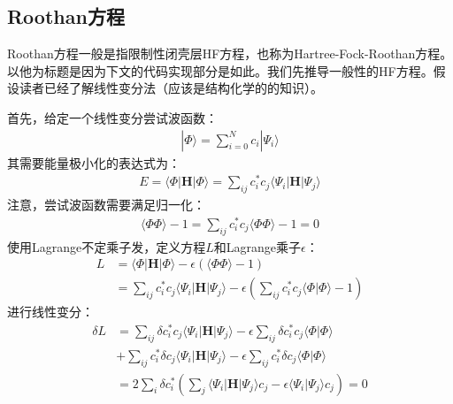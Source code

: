 \documentclass[12pt, a4paper, oneside]{ctexart}
\begin{document}
\subsection{Roothan方程}
Roothan方程一般是指限制性闭壳层HF方程，也称为Hartree-Fock-Roothan方程。以他为标题是因为下文的代码实现部分是如此。我们先推导一般性的HF方程。假设读者已经了解线性变分法（应该是结构化学的的知识）。\par
首先，给定一个线性变分尝试波函数：
\begin{equation}
\begin{aligned}
|\Phi\rangle=\sum_{i=0}^Nc_i|\Psi_i\rangle
\end{aligned}
\end{equation}
其需要能量极小化的表达式为：
\begin{equation}
\begin{aligned}
E=\langle\Phi|\mathbf{H}|\Phi\rangle=\sum_{ij}c_i^*c_j\langle\Psi_i|\mathbf{H}|\Psi_j\rangle
\end{aligned}
\end{equation}
注意，尝试波函数需要满足归一化：
\begin{equation}
\begin{aligned}
\langle\Phi\Phi\rangle-1=\sum_{ij}c_i^*c_j\langle\Phi\Phi\rangle-1=0
\end{aligned}
\end{equation}
使用Lagrange不定乘子发，定义方程$L$和Lagrange乘子$\epsilon$：
\begin{equation}
\begin{aligned}
L&=\langle\Phi|\mathbf{H}|\Phi\rangle-\epsilon(\langle\Phi\Phi\rangle-1)\\
 &=\sum_{ij}c_i^*c_j\langle\Psi_i|\mathbf{H}|\Psi_j\rangle-\epsilon\left(\sum_{ij}c_i^*c_j\langle\Phi|\Phi\rangle-1\right)
\end{aligned}
\end{equation}
进行线性变分：
\begin{equation}
\begin{aligned}
\delta L&=\sum_{ij}\delta c_i^*c_j\langle\Psi_i|\mathbf{H}|\Psi_j\rangle-\epsilon\sum_{ij}\delta c_i^*c_j\langle\Phi|\Phi\rangle\\&+\sum_{ij}c_i^*\delta c_j\langle\Psi_i|\mathbf{H}|\Psi_j\rangle-\epsilon\sum_{ij}c_i^*\delta c_j\langle\Phi|\Phi\rangle\\
&=2\sum_i\delta c_i^*\left(\sum_j\langle\Psi_i|\mathbf{H}|\Psi_j\rangle c_j-\epsilon \langle\Psi_i|\Psi_j\rangle c_j\right)=0
\end{aligned}
\end{equation}
\end{document}
